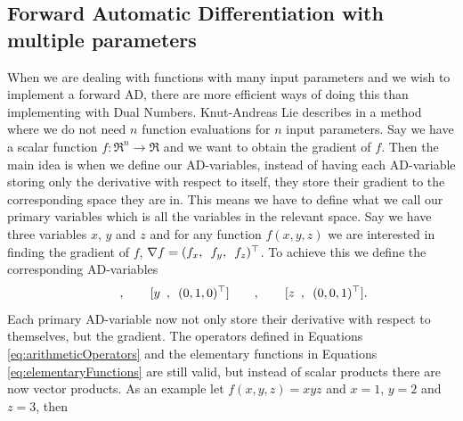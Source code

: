 \subsection{Forward Automatic Differentiation with multiple parameters}
When we are dealing with functions with many input parameters and we wish to implement a forward AD, there are more efficient ways of doing this than implementing with Dual Numbers. Knut-Andreas Lie describes in \emph{\citet{lieMrstUrl}} a method where we do not need $n$ function evaluations for $n$ input parameters. Say we have a scalar function $f: \Re^n \rightarrow \Re$ and we want to obtain the gradient of $f$. Then the main idea is when we define our AD-variables, instead of having each AD-variable storing only the derivative with respect to itself, they store their gradient to the corresponding space they are in. This means we have to define what we call our primary variables which is all the variables in the relevant space. Say we have three variables $x$, $y$ and $z$ and for any function $f(x,y,z)$ we are interested in finding the gradient of $f$, $\nabla f=(f_x,\hspace{0.5em} f_y,\hspace{0.5em} f_z)^\top$. To achieve this we define the corresponding AD-variables
\begin{equation*}
    [x\hspace{0.5em},\hspace{0.5em}(1,0,0)^\top]\hspace{2em},\hspace{2em}
    [y\hspace{0.5em},\hspace{0.5em}(0,1,0)^\top]\hspace{2em},\hspace{2em}
    [z\hspace{0.5em},\hspace{0.5em}(0,0,1)^\top].
\end{equation*}
Each primary AD-variable now not only store their derivative with respect to themselves, but the gradient. The operators defined in Equations \ref{eq:arithmeticOperators} and the elementary functions in Equations \ref{eq:elementaryFunctions} are still valid, but instead of scalar products there are now vector products. As an example let $f(x,y,z) = xyz$ and $x = 1$, $y = 2$ and $z = 3$, then
